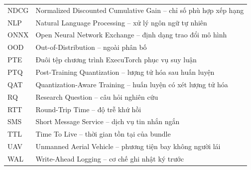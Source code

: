 \begin{longtable}{P{.14\textwidth}P{.78\textwidth}}
NDCG & Normalized Discounted Cumulative Gain -- chỉ số phù hợp xếp hạng \\
NLP & Natural Language Processing -- xử lý ngôn ngữ tự nhiên \\
ONNX & Open Neural Network Exchange -- định dạng trao đổi mô hình \\
OOD & Out-of-Distribution -- ngoài phân bố \\
PTE & Đuôi tệp chương trình ExecuTorch phục vụ suy luận \\
PTQ & Post-Training Quantization -- lượng tử hóa sau huấn luyện \\
QAT & Quantization-Aware Training -- huấn luyện có xét lượng tử hóa \\
RQ & Research Question -- câu hỏi nghiên cứu \\
RTT & Round-Trip Time -- độ trễ khứ hồi \\
SMS & Short Message Service -- dịch vụ tin nhắn ngắn \\
TTL & Time To Live -- thời gian tồn tại của bundle \\
UAV & Unmanned Aerial Vehicle -- phương tiện bay không người lái \\
WAL & Write-Ahead Logging -- cơ chế ghi nhật ký trước \\
\bottomrule
\end{longtable}
